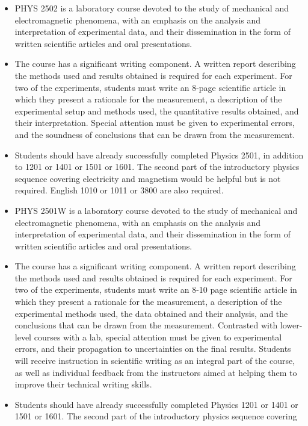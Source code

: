 \documentclass{revtex4}
\begin{document}
\begin{itemize}
\item
PHYS 2502 is a laboratory course devoted to the study of
mechanical and electromagnetic phenomena, with an emphasis on
the analysis and interpretation of experimental data, and their
dissemination in the form of written scientific articles and
oral presentations.
\item
The course has a significant writing component.  A written
report describing the methods used and results obtained is required
for each experiment.  For two of the experiments, students must write
an 8-page scientific article in which they present a rationale for
the measurement, a description of the experimental setup and methods
used, the quantitative results obtained, and their interpretation.
Special attention must be given to experimental errors, and the
soundness of conclusions that can be drawn from the measurement.
\item
Students should have already successfully completed Physics 2501, in
addition to 1201 or 1401 or 1501 or 1601.  The second part of the
introductory physics sequence covering electricity and magnetism would be
helpful but is not required.  English 1010 or 1011 or 3800 are also required.
\item
PHYS 2501W is a laboratory course devoted to the study of mechanical and
electromagnetic phenomena, with an emphasis on the analysis and
interpretation of experimental data, and their dissemination in the
form of written scientific articles and oral presentations.
\item
The course has a significant writing component. A written report describing
the methods used and results obtained is required for each experiment.
For two of the experiments, students must write an 8-10 page scientific
article in which they present a rationale for the measurement, a description
of the experimental methods used, the data obtained and their analysis, and
the conclusions that can be drawn from the measurement. Contrasted with
lower-level courses with a lab, special attention must be given to
experimental errors, and their propagation to uncertainties on the final
results. Students will receive instruction in scientific writing as an
integral part of the course, as well as individual feedback from the
instructors aimed at helping them to improve their technical writing skills.
\item
Students should have already successfully completed Physics 1201 or 1401 or
1501 or 1601. The second part of the introductory physics sequence covering

\end{itemize}
\end{document}
